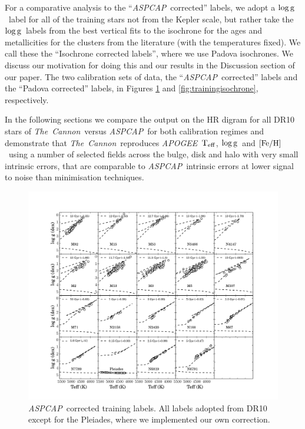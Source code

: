\documentclass[12pt, preprint]{aastex}
\newcommand{\teff}{\mbox{$\rm T_{eff}$}}
\newcommand{\feh}{\mbox{$\rm [Fe/H]$}}
\newcommand{\logg}{\mbox{$\rm \log g$}}
\newcommand{\tc}{\textsl{The~Cannon}}
\newcommand{\apogee}{\textsl{APOGEE}}
\newcommand{\aspcap}{\textsl{ASPCAP}}
\begin{document}
For a comparative analysis to the ``\aspcap\ corrected'' labels, we adopt a \logg\ label for all of the training stars not from the Kepler scale, but rather take the \logg\ labels from the best vertical fits to the isochrone for the ages and metallicities for the clusters from the literature (with the temperatures fixed). We call these the ``Isochrone corrected labels'', where we use Padova isochrones. We discuss our motivation for doing this and our results in the Discussion section of our paper.  The two calibration sets of data, the ``\aspcap\ corrected'' labels and the ``Padova corrected'' labels, in Figures \ref{fig:trainingaspcap} and \ref{fig:trainingisochrone}, respectively. 

In the following sections we compare the output on the HR digram for all DR10 stars of \tc\ versus \aspcap\ for both calibration regimes and demonstrate that \tc\ reproduces \apogee\ \teff, \logg\ and \feh\ using a number of selected fields across the bulge, disk and halo with very small intrinsic errors, that are comparable to \aspcap\ intrinsic errors at lower signal to noise than minimisation techniques.

\begin{figure}[h!]
\centering
    \includegraphics[scale=0.4]{./plots/training_aspcap.pdf}
\caption{\aspcap\ corrected training labels. All labels adopted from DR10 except for the Pleiades, where we implemented our own correction. }
\label{fig:trainingaspcap}
\end{figure}
\end{document}
